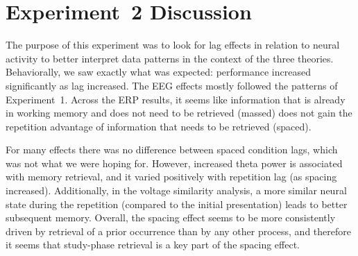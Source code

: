 

\section{Experiment~2 Discussion}

\cbstart
The purpose of this experiment was to look for lag effects in relation to neural activity to better interpret data patterns in the context of the three theories.
Behaviorally, we saw exactly what was expected: performance increased significantly as lag increased.  The EEG effects mostly followed the patterns of Experiment~1.  Across the ERP results, it seems like information that is already in working memory and does not need to be retrieved (massed) does not gain the repetition advantage of information that needs to be retrieved (spaced).

For many effects there was no difference between spaced condition lags, which was not what we were hoping for.  However, increased theta power is associated with memory retrieval, and it varied positively with repetition lag (as spacing increased).  Additionally, in the voltage similarity analysis, a more similar neural state during the repetition (compared to the initial presentation) leads to better subsequent memory.   Overall, the spacing effect seems to be more consistently driven by retrieval of a prior occurrence than by any other process, and therefore it seems that study-phase retrieval is a key part of the spacing effect.
\cbend




